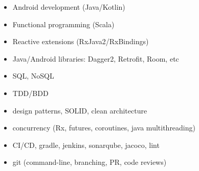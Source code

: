  \begin{multicols}{2}
    \begin{itemize}
	    \item Android development (Java/Kotlin)
	    \item Functional programming (Scala)
	    \item Reactive extensions (RxJava2/RxBindings) 
	    \item Java/Android libraries: Dagger2, Retrofit, Room, etc
	    \item SQL, NoSQL
	    \item TDD/BDD
	    \item design patterns, SOLID, clean architecture
	    \item concurrency (Rx, futures, coroutines, java multithreading) 
	    \item CI/CD, gradle, jenkins, sonarqube, jacoco, lint
	    \item git (command-line, branching, PR, code reviews)
    \end{itemize}
 \end{multicols}
